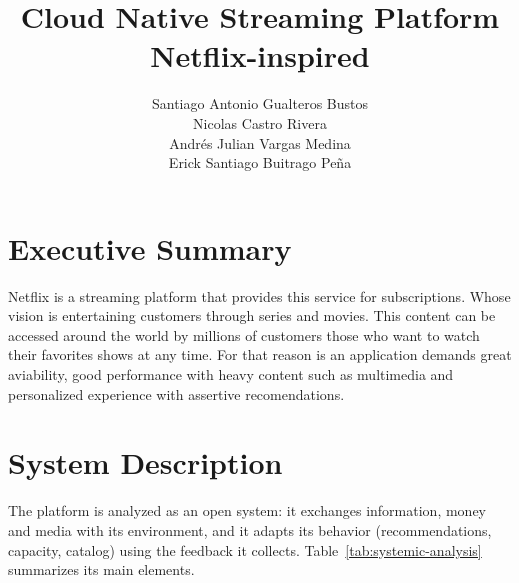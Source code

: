 \documentclass{article}
\title{Cloud Native Streaming Platform Netflix-inspired}
\author{ Santiago Antonio Gualteros Bustos \\ Nicolas Castro Rivera \\ Andrés Julian Vargas Medina \\ Erick Santiago Buitrago Peña   }
\date{}
\begin{document}
\maketitle

\section{Executive Summary}
Netflix is a streaming platform that provides this service for subscriptions. Whose vision is entertaining customers through series and movies.
This content can be accessed around the world by millions of customers those who want to watch their favorites shows at any time.
For that reason is an application demands great aviability, good performance with heavy content such as multimedia and personalized experience with assertive recomendations.

\section{System Description}
The platform is analyzed as an open system: it exchanges information, money and media with its environment, and it adapts its behavior (recommendations, capacity, catalog) using the feedback it collects. Table~\ref{tab:systemic-analysis} summarizes its main elements.
 
\end{document}
